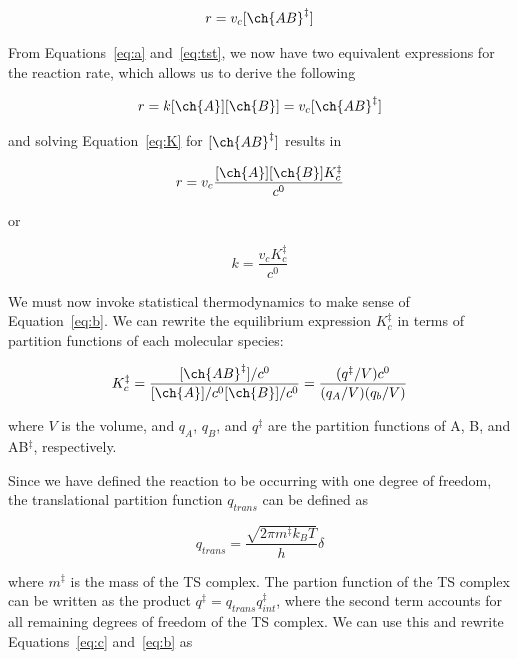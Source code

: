 \begin{doublespace}
\begin{equation}
  r = v_c [\ch{AB}^\ddagger]
\end{equation}

From Equations~\ref{eq:a} and~\ref{eq:tst}, we now have two equivalent
expressions for the reaction rate, which allows us to derive the following

\begin{equation}
  r = k[\ch{A}][\ch{B}] = v_c [\ch{AB}^\ddagger]
\end{equation}

\noindent and solving Equation~\ref{eq:K} for $[\ch{AB}^\ddagger]$ results in


\begin{equation}
  r = v_c\frac{[\ch{A}][\ch{B}]K_c^\ddagger}{c^0}
\end{equation}

\noindent or

\begin{equation}
  k = \frac{v_c K_c^\ddagger}{c^0}
\label{eq:b}
\end{equation}

We must now invoke statistical thermodynamics to make sense of
Equation~\ref{eq:b}. We can rewrite the equilibrium expression $K_c^\ddagger$ in
terms of partition functions of each molecular species:

\begin{equation}
    K_c^{\ddagger} = \frac{[\ch{AB}^\ddagger]/c^0}{[\ch{A}]/c^0[\ch{B}]/c^0}
    = \frac{(q^\ddagger/V)c^0}{(q_A/V)(q_b/V)}
\label{eq:c}
\end{equation}

\noindent where $V$ is the volume, and $q_A$, $q_B$, and $q^\ddagger$ are the
partition functions of A, B, and AB$^\ddagger$, respectively.

Since we have defined the reaction to be occurring with one degree of freedom,
the translational partition function $q_{trans}$ can be defined as

\begin{equation}
  q_{trans} = \frac{\sqrt{2\pi m^\ddagger k_B T}}{h}\delta
\end{equation}

\noindent where $m^\ddagger$ is the mass of the TS complex. The partion
function of the TS complex can be written as the product $q^\ddagger =
q_{trans}q_{int}^\ddagger$, where the second term accounts for all remaining
degrees of freedom of the TS complex. We can use this and rewrite
Equations~\ref{eq:c} and~\ref{eq:b} as


\end{doublespace}
